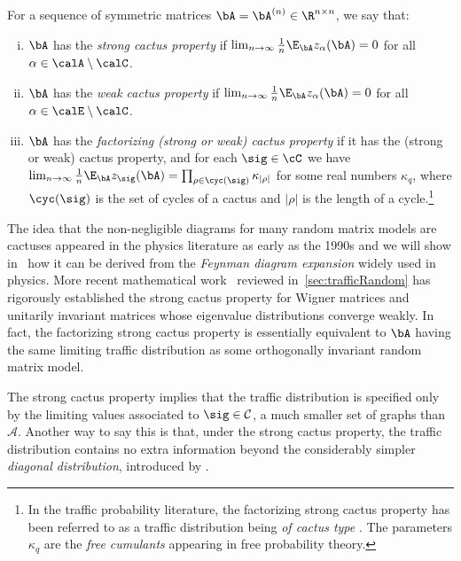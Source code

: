 \begin{definition}\label{def:cactus-property}
    For a sequence of symmetric matrices $\bA = \bA^{(n)} \in \R^{n \times n}$, we say that:
    \begin{enumerate}[(i)]
        \item $\bA$ has the \emph{strong cactus property} if $\lim_{n \to \infty} \frac{1}{n}\E_\bA z_{\alpha}(\bA) = 0$ for all $\alpha \in \calA \setminus \calC$.
        \item $\bA$ has the \emph{weak cactus property} if $\lim_{n \to \infty} \frac{1}{n} \E_\bA z_{\alpha}(\bA) = 0$ for all $\alpha \in \calE \setminus \calC$.
        \item $\bA$ has the \emph{factorizing (strong or weak) cactus property} if it has the (strong or weak) cactus property, and for each $\sig \in \cC$ we have $\lim_{n \to \infty}\frac 1n \E_\bA z_\sig(\bA) = \prod_{\rho \in \cyc(\sig)} \kappa_{|\rho|}$ for some real numbers $\kappa_q$, where $\cyc(\sig)$ is the set of cycles of a cactus and $|\rho|$ is the length of a cycle.\footnote{In the traffic probability literature, the factorizing strong cactus property has been referred to as a traffic distribution being \emph{of cactus type} \cite{cebron2024traffic}. The parameters $\kappa_q$ are the \emph{free cumulants} appearing in free probability theory.}
    \end{enumerate}
\end{definition}

The idea that the non-negligible diagrams for many random matrix models are cactuses appeared in the physics literature as early as the 1990s \cite{parisi1995mean, MFCKMZ-2019-PlefkaExpansionOrthogonalIsing}
and we will show in~ how it can be derived from the \emph{Feynman diagram expansion} widely used in physics.
More recent mathematical work~\cite{male2020traffic,cebron2024traffic} reviewed in~\cref{sec:trafficRandom} has rigorously established the strong cactus property for Wigner matrices and unitarily invariant matrices whose eigenvalue distributions converge weakly.
In fact,  
the factorizing strong cactus property is essentially {equivalent} to $\bA$ having the same limiting traffic distribution as some orthogonally invariant random matrix model.

The strong cactus property implies that the traffic distribution is specified only by the limiting values associated to $\sig \in \mathcal{C}$, a much smaller set of graphs than $\mathcal{A}$.
Another way to say this is that, under the strong cactus property, the traffic distribution contains no extra information beyond the considerably simpler \emph{diagonal distribution}, introduced by \cite{wang2022universality}.

